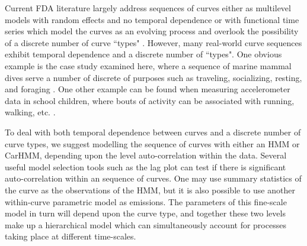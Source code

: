 

Current FDA literature largely address sequences of curves either as multilevel models with random effects and no temporal dependence \cite{chen:2012,di:2009} or with functional time series which model the curves as an evolving process and overlook the possibility of a discrete number of curve ``types" \cite{Kokoszka:2018}. However, many real-world curve sequences exhibit temporal dependence and a discrete number of ``types". One obvious example is the case study examined here, where a sequence of marine mammal dives serve a number of discrete of purposes such as traveling, socializing, resting, and foraging \citep{Tennessen:2019a}. One other example can be found when measuring accelerometer data in school children, where bouts of activity can be associated with running, walking, etc. \citep{Morris:2007}.

To deal with both temporal dependence between curves and a discrete number of curve types, we suggest modelling the sequence of curves with either an HMM or CarHMM, depending upon the level auto-correlation within the data. Several useful model selection tools such as the lag plot can test if there is significant auto-correlation within an sequence of curves. One may use summary statistics of the curve as the observations of the HMM, but it is also possible to use another within-curve parametric model as emissions. The parameters of this fine-scale model in turn will depend upon the curve type, and together these two levels make up a hierarchical model which can simultaneously account for processes taking place at different time-scales.



